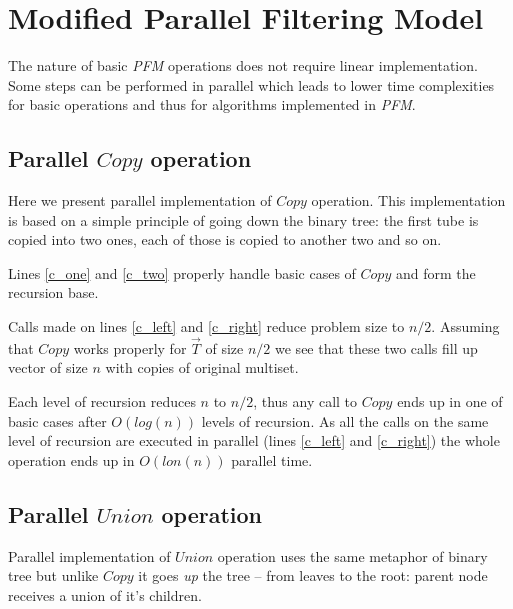 \section{Modified Parallel Filtering Model}\label{mpfm}

The nature of basic \emph{PFM} operations does not require linear implementation. Some steps can be performed in parallel which leads to lower time complexities for basic operations and thus for algorithms implemented in \emph{PFM}.

\subsection{Parallel $Copy$ operation}

Here we present parallel implementation of $Copy$ operation. This implementation is based on a simple principle of going down the binary tree: the first tube is copied into two ones, each of those is copied to another two and so on.


Lines \ref{c_one} and \ref{c_two} properly handle basic cases of $Copy$ and form the recursion base.

Calls made on lines \ref{c_left} and \ref{c_right} reduce problem size to $n/2$. Assuming that $Copy$ works properly for $\vec{T}$ of size $n/2$ we see that these two calls fill up vector of size $n$ with copies of original multiset.

Each level of recursion reduces $n$ to $n/2$, thus any call to $Copy$ ends up in one of basic cases after $O(log(n))$ levels of recursion. As all the calls on the same level of recursion are executed in parallel (lines \ref{c_left} and \ref{c_right}) the whole operation ends up in $O(lon(n))$ parallel time.

\subsection{Parallel $Union$ operation}

Parallel implementation of $Union$ operation uses the same metaphor of binary tree but unlike $Copy$ it goes \emph{up} the tree -- from leaves to the root: parent node receives a union of it's children.

